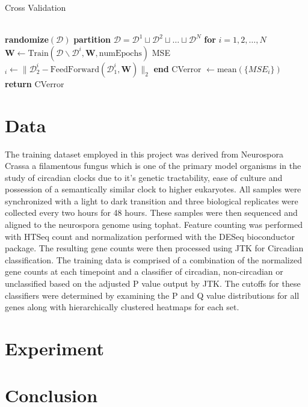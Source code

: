 \documentclass[prl,amsmath,amssymb,floatfix,superscriptaddress,notitlepage,twocolumn]{revtex4}
\begin{document}
\begin{algorithm}[H]
\caption{Cross Validation}\label{cross_val}
\begin{algorithmic}[]
\\

\State \textbf{randomize}$(\mathcal{D})$
\State \textbf{partition} $\mathcal{D}=\mathcal{D}^1\sqcup\mathcal{D}^2\sqcup\dots\sqcup\mathcal{D}^N$
\State \textbf{for } $i=1,2,\dots,N$
\State \hspace{.25cm} $\textbf{W}\gets \text{Train}(\mathcal{D\backslash \mathcal{D}}^i, \textbf{W}, \text{numEpochs})$
\State \hspace{.25cm} MSE$_i\gets\|\mathcal{D}^i_2-\text{FeedForward}(\mathcal{D}^i_1,\textbf{W})\|_2$
\State \textbf{end}
\State CVerror $\gets \text{mean}(\{MSE_i\})$\\
\State \textbf{return} CVerror\\

\EndProcedure
\end{algorithmic}
\end{algorithm}

\section{Data}
The training dataset employed in this project was derived from Neurospora Crassa a filamentous fungus which is one of the primary model organisms in the study of circadian clocks due to it's genetic tractability, ease of culture and possession of a semantically similar clock to higher eukaryotes.  All samples were synchronized with a light to dark transition and three biological replicates were collected every two hours for 48 hours.  These samples were then sequenced and aligned to the neurospora genome using tophat.  Feature counting was performed with HTSeq count and normalization performed with the DESeq bioconductor package.  The resulting gene counts were then processed using JTK for Circadian classification.  The training data is comprised of a combination of the normalized gene counts at each timepoint and a classifier of circadian, non-circadian or unclassified based on the adjusted P value output by JTK. The cutoffs for these classifiers were determined by examining the P and Q value distributions for all genes along with hierarchically clustered heatmaps for each set.

\section{Experiment}

\section{Conclusion}

{}

\end{document}
